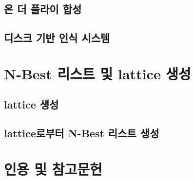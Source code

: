 \documentclass[../main.tex]{subfiles}
\begin{document}
\subsection{온 더 플라이 합성}
\subsection{디스크 기반 인식 시스템}

\section{N-Best 리스트 및 lattice 생성}
\subsection{lattice 생성}
\subsection{lattice로부터 N-Best 리스트 생성}

\section*{인용 및 참고문헌}
\end{document}
